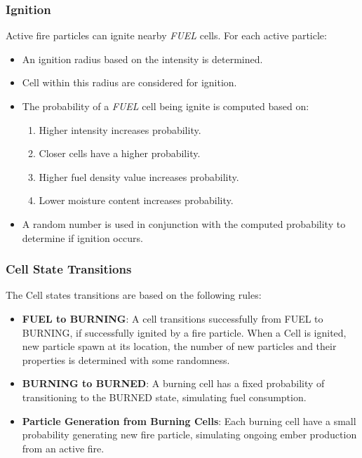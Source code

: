 \subsubsection{Ignition}
Active fire particles can ignite nearby \textit{FUEL} cells. For each active particle:
\begin{itemize}
	\item An ignition radius based on the intensity is determined.
	\item Cell within this radius are considered for ignition.
	\item The probability of a \textit{FUEL} cell being ignite is computed based on:
	      \begin{enumerate}
		      \item Higher intensity increases probability.
		      \item Closer cells have a higher probability.
		      \item Higher fuel density value increases probability.
		      \item Lower moisture content increases probability.
	      \end{enumerate}
	\item A random number is used in conjunction with the computed probability to determine if ignition occurs.
\end{itemize}
\subsubsection{Cell State Transitions}
The Cell states transitions are based on the following rules:
\begin{itemize}
	\item \textbf{FUEL to BURNING}: A cell transitions successfully from FUEL to BURNING, if successfully ignited by a fire particle. When a Cell is ignited, new particle spawn at its location, the number of new particles and their properties is determined with some randomness.
	\item \textbf{BURNING to BURNED}: A burning cell has a fixed probability of transitioning to the BURNED state, simulating fuel consumption.
	\item \textbf{Particle Generation from Burning Cells}: Each burning cell have a small probability generating new fire particle, simulating ongoing ember production from an active fire.
\end{itemize}
